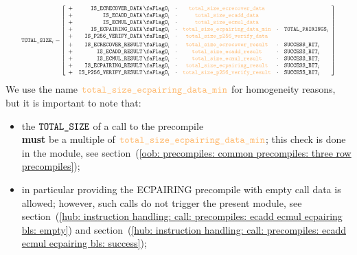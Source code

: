 \[
	\resizebox{.95\linewidth}{!}{$
	    \ecdataTotalSize _{i}
	    =
	    \left[ \begin{array}{crcccl}
        + & \isEcrecoverData   _{i} & \cdot & \totalSizeEcrecoverData                                      \\
        + & \isEcaddData       _{i} & \cdot & \totalSizeEcaddData                                          \\
        + & \isEcmulData       _{i} & \cdot & \totalSizeEcmulData                                          \\
        + & \isEcpairingData   _{i} & \cdot & \totalSizeEcpairingDataMin  & \cdot & \totalPairings    _{i} \\
        + & \isPVerifyData     _{i} & \cdot & \totalSizePVerifyData      \vspace{1mm}                      \\
        + & \isEcrecoverResult _{i} & \cdot & \totalSizeEcrecoverResult   & \cdot & \ecdataSuccessBit _{i} \\
        + & \isEcaddResult     _{i} & \cdot & \totalSizeEcaddResult       & \cdot & \ecdataSuccessBit _{i} \\
        + & \isEcmulResult     _{i} & \cdot & \totalSizeEcmulResult       & \cdot & \ecdataSuccessBit _{i} \\
        + & \isEcpairingResult _{i} & \cdot & \totalSizeEcpairingResult   & \cdot & \ecdataSuccessBit _{i} \\
	        + & \isPVerifyResult   _{i} & \cdot & \totalSizePVerifyResult     & \cdot & \ecdataSuccessBit _{i} \\
	    \end{array} \right]
	$}
\]
\saNote{} We use the name $\totalSizeEcpairingDataMin$ for homogeneity reasons, but it is important to note that:
\begin{itemize}
    \item
        the $\texttt{TOTAL\_SIZE}$ of a call to the \instEcpairing{} precompile\\
        \textbf{must} be a multiple of $\totalSizeEcpairingDataMin$;
        this check is done in the \oobMod{} module, see
        section~(\ref{oob: precompiles: common precompiles: three row precompiles}); 
    \item
		in particular providing the ECPAIRING precompile with empty call data is allowed;
		however, such calls do not trigger the present module, see
        section~(\ref{hub: instruction handling: call: precompiles: ecadd ecmul ecpairing bls: empty}) and
        section~(\ref{hub: instruction handling: call: precompiles: ecadd ecmul ecpairing bls: success});
\end{itemize}
